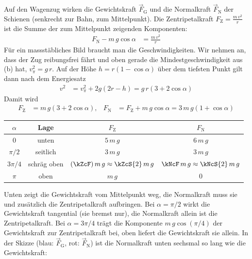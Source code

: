 \begin{abcliste}
\abc Auf den Wagenzug wirken die Gewichtskraft $\vec F_\mathrm{G}$ und die Normalkraft $\vec F_\mathrm{N}$ der Schienen (senkrecht zur Bahn, zum Mittelpunkt). Die Zentripetalkraft $F_\mathrm{Z} = \frac{m\,v^2}{r}$ ist die Summe der zum Mittelpunkt zeigenden Komponenten:
\begin{align}
 F_\mathrm{N} - m\,g\cos\alpha &= \frac{m\,v^2}{r}
\end{align}
Für ein massstäbliches Bild braucht man die Geschwindigkeiten. Wir nehmen an, dass der Zug reibungsfrei fährt und oben gerade die Mindestgeschwindigkeit aus (b) hat, $v_\pi^2 = g\,r$. Auf der Höhe $h = r\left(1-\cos\alpha\right)$ über dem tiefsten Punkt gilt dann nach dem Energiesatz
\begin{align}
 v^2 &= v_\pi^2 + 2g\left(2r-h\right) = g\,r\left(3+2\cos\alpha\right)
\end{align}
Damit wird
\begin{align}
 F_\mathrm{Z} &= m\,g\left(3+2\cos\alpha\right), & F_\mathrm{N} &= F_\mathrm{Z} + m\,g\cos\alpha = 3\,m\,g\left(1+\cos\alpha\right)
\end{align}
\begin{center}
\begin{tabular}{c|c|c|c}
 $\alpha$ & Lage & $F_\mathrm{Z}$ & $F_\mathrm{N}$ \\ \hline
 $0$ & unten & $5\,m\,g$ & $6\,m\,g$ \\
 $\pi/2$ & seitlich & $3\,m\,g$ & $3\,m\,g$ \\
 $3\pi/4$ & schräg oben & $\left(\kZcF\right)m\,g \approx \kZcS{2}\,m\,g$ & $\kNcF\,m\,g \approx \kNcS{2}\,m\,g$ \\
 $\pi$ & oben & $m\,g$ & $0$
\end{tabular}
\end{center}
Unten zeigt die Gewichtskraft vom Mittelpunkt weg, die Normalkraft muss sie und zusätzlich die Zentripetalkraft aufbringen. Bei $\alpha = \pi/2$ wirkt die Gewichtskraft tangential (sie bremst nur), die Normalkraft allein ist die Zentripetalkraft. Bei $\alpha = 3\pi/4$ trägt die Komponente $m\,g\cos\left(\pi/4\right)$ der Gewichtskraft zur Zentripetalkraft bei, oben liefert die Gewichtskraft sie allein. In der Skizze (blau: $\vec F_\mathrm{G}$, rot: $\vec F_\mathrm{N}$) ist die Normalkraft unten sechsmal so lang wie die Gewichtskraft:


\end{abcliste}
